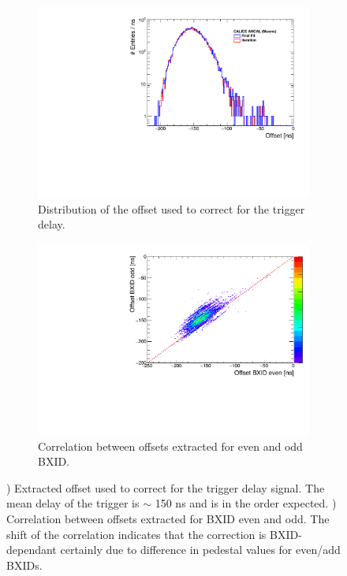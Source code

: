 \begin{figure}[htbp!]
	\begin{subfigure}[t]{0.45\textwidth}
		\centering
		\includegraphics[width=1\textwidth]{chap5/fig_AHCAL_timing/Muons/ExtractedOffsets.pdf}
		\caption{Distribution of the offset used to correct for the trigger delay.}\label{fig:offset_trigger_distribution}
	\end{subfigure}
	\hfill
	\begin{subfigure}[t]{0.45\textwidth}
		\centering
		\includegraphics[width=1\textwidth]{chap5/fig_AHCAL_timing/Muons/CorrelationOffsets_BXID.pdf}
		\caption{Correlation between offsets extracted for even and odd BXID.}\label{fig:BXID_offset}
	\end{subfigure}
	\caption{) Extracted offset used to correct for the trigger delay signal. The mean delay of the trigger is $\sim$ 150 ns and is in the order expected. ) Correlation between offsets extracted for BXID even and odd. The shift of the correlation indicates that the correction is BXID-dependant certainly due to difference in pedestal values for even/add BXIDs.}
\end{figure}

